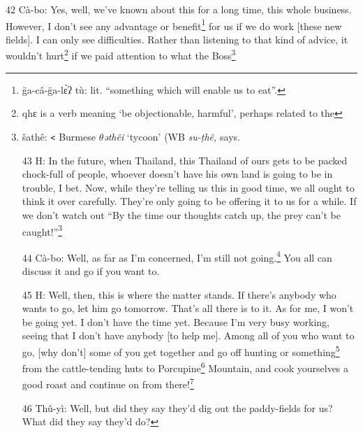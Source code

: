 42 Cà-bo: Yes, well, we've known about this for a long time, this whole business.
However, I don't see any advantage or benefit\footnote{g̈a-câ-g̈a-lɛ̀ʔ tù: lit. ``something which will enable us to eat''.} for us if we do work [these new
fields]. I can only see difficulties. Rather than listening to that kind of advice,
it wouldn't hurt\footnote{qhɛ is a verb meaning `be objectionable, harmful', perhaps related to the} if we paid attention to what the Boss\footnote{šathê: \texttt{<} Burmese \textit{$\theta$əthêi} `tycoon' (WB \textit{su-ṭhê,} says.

43 H: In the future, when Thailand, this Thailand of ours gets to be packed chock-full
of people, whoever doesn't have his own land is going to be in trouble, I bet.
Now, while they're telling us this in good time, we all ought to think it over
carefully. They're only going to be offering it to us for a while. If we don't
watch out ``By the time our thoughts catch up, the prey can't be caught!''\footnote{dɔ̂ mi qo g̈àʔ â mi: lit. ``when think-overtake, chase not overtake.\texttt{"}}

44 Cà-bo: Well, as far as I'm concerned, I'm still not going.\footnote{mâ + V + šɔ̄: `still not V'. But mâ + V + šē: `not V yet'.} You all can
discuss it and go if you want to.

45 H: Well, then, this is where the matter stands. If there's anybody who wants
to go, let him go tomorrow. That's all there is to it. As for me, I won't be going
yet. I don't have the time yet. Because I'm very busy working, seeing that I don't
have anybody [to help me]. Among all of you who want to go, [why don't] some of
you get together and go off hunting or something\footnote{The morpheme mû appears in elaborate expressions with intensifying force.} from the cattle-tending huts
to Porcupine\footnote{fâʔ-pɛ́: `brush-tailed porcupine'.} Mountain, and cook yourselves a good roast and continue on from
there!\footnote{I.e., the Headman is suggesting they go hunting on their way to inspect the}

46 Thû-yì: Well, but did they say they'd dig out the paddy-fields for us? What
did they say they'd do?

}
